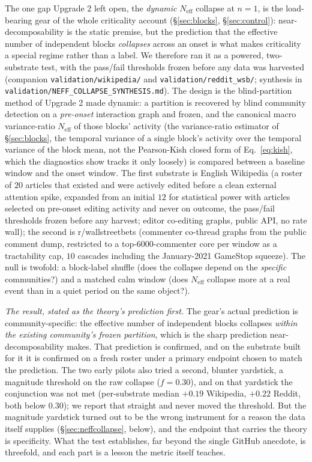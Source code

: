 \documentclass[11pt]{article}
\begin{document}
The one gap Upgrade 2 left open, the \emph{dynamic} $N_{\mathrm{eff}}$ collapse at $n=1$, is the load-bearing gear of the whole criticality account (\S\ref{sec:blocks}, \S\ref{sec:control}): near-decomposability is the static premise, but the prediction that the effective number of independent blocks \emph{collapses} across an onset is what makes criticality a special regime rather than a label. We therefore ran it as a powered, two-substrate test, with the pass/fail thresholds frozen before any data was harvested (companion \texttt{validation/wikipedia/} and \texttt{validation/reddit\_wsb/}; synthesis in \texttt{validation/NEFF\_COLLAPSE\_SYNTHESIS.md}). The design is the blind-partition method of Upgrade 2 made dynamic: a partition is recovered by blind community detection on a \emph{pre-onset} interaction graph and frozen, and the canonical macro variance-ratio $N_{\mathrm{eff}}$ of those blocks' activity (the variance-ratio estimator of \S\ref{sec:blocks}, the temporal variance of a single block's activity over the temporal variance of the block mean, not the Pearson-Kish closed form of Eq.~\eqref{eq:kish}, which the diagnostics show tracks it only loosely) is compared between a baseline window and the onset window. The first substrate is English Wikipedia (a roster of $20$ articles that existed and were actively edited before a clean external attention spike, expanded from an initial $12$ for statistical power with articles selected on pre-onset editing activity and never on outcome, the pass/fail thresholds frozen before any harvest; editor co-editing graphs, public API, no rate wall); the second is r/wallstreetbets (commenter co-thread graphs from the public comment dump, restricted to a top-$6000$-commenter core per window as a tractability cap, $10$ cascades including the January-2021 GameStop squeeze). The null is twofold: a block-label shuffle (does the collapse depend on the \emph{specific} communities?) and a matched calm window (does $N_{\mathrm{eff}}$ collapse more at a real event than in a quiet period on the same object?).

\emph{The result, stated as the theory's prediction first.} The gear's actual prediction is community-specific: the effective number of independent blocks collapses \emph{within the existing community's frozen partition}, which is the sharp prediction near-decomposability makes. That prediction is confirmed, and on the substrate built for it it is confirmed on a fresh roster under a primary endpoint chosen to match the prediction. The two early pilots also tried a second, blunter yardstick, a magnitude threshold on the raw collapse ($f=0.30$), and on that yardstick the conjunction was not met (per-substrate median $+0.19$ Wikipedia, $+0.22$ Reddit, both below $0.30$); we report that straight and never moved the threshold. But the magnitude yardstick turned out to be the wrong instrument for a reason the data itself supplies (\S\ref{sec:neffcollapse}, below), and the endpoint that carries the theory is specificity. What the test establishes, far beyond the single GitHub anecdote, is threefold, and each part is a lesson the metric itself teaches.
\end{document}
